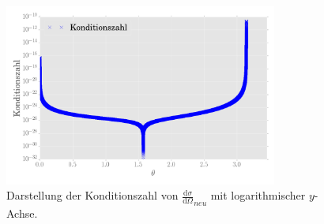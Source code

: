 \begin{figure}
\centering
\includegraphics[width=0.8\textwidth]{plot4_elog.png}
\caption{Darstellung der Konditionszahl von  $\frac{\mathup{d}\sigma}{\mathup{d}\Omega}_{neu}$ mit logarithmischer $y$-Achse.}
\label{4}
\end{figure}